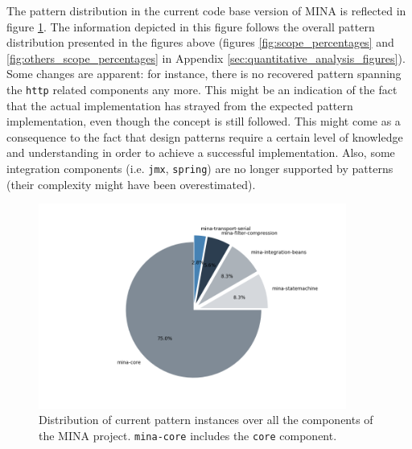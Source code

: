 The pattern distribution in the current code base version of MINA is reflected in figure \ref{fig:current_scopes_percentages}. The information depicted in this figure follows the overall pattern distribution presented in the figures above (figures \ref{fig:scope_percentages} and \ref{fig:others_scope_percentages} in Appendix \ref{sec:quantitative_analysis_figures}). Some changes are apparent: for instance, there is no recovered pattern spanning the \texttt{http} related components any more. This might be an indication of the fact that the actual implementation has strayed from the expected pattern implementation, even though the concept is still followed. This might come as a consequence to the fact that design patterns require a certain level of knowledge and understanding in order to achieve a successful implementation. Also, some integration components (i.e. \texttt{jmx}, \texttt{spring}) are no longer supported by patterns (their complexity might have been overestimated).
\begin{figure}
    \centering
    \includegraphics[width =0.9\textwidth]{images/graphs/current_scopes_per.png}
    \caption{Distribution of current pattern instances over all the components of the MINA project. \texttt{mina-core} includes the \texttt{core} component.}
    \label{fig:current_scopes_percentages}
\end{figure}

